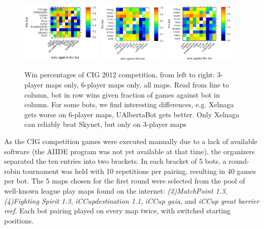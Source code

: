 \documentclass[journal]{IEEEtran}
\begin{document}
\begin{figure}[t]
    \centering
    \includegraphics[width=0.34\textwidth]{figures/vstable3.pdf}
    \includegraphics[width=0.3\textwidth]{figures/vstable6.pdf}
    \includegraphics[width=0.3\textwidth]{figures/vstable.pdf}
    \caption{Win percentages of CIG 2012 competition, from left
    to right: 3-player maps only, 6-player maps only, all maps.
    Read from line to column, bot in row wins given fraction of
    games against bot in column. For some bots, we find interesting
    differences, e.g. Xelnaga gets worse on 6-player maps, UAlbertaBot
    gets better. Only Xelnaga can reliably beat Skynet, but only on 
    3-player maps}
    \label{fig:cig2012-mapresults}
\end{figure}


As the CIG competition games were executed manually due to
a lack of available software (the AIIDE program was not yet
available at that time), the organizers separated the ten entries into
two brackets. In each bracket of 5 bots, a round-robin
tournament was held with 10 repetitions per pairing, resulting
in 40 games per bot.
The 5 maps chosen for the first round were selected from the pool
of well-known league play maps found on the internet:
\emph{(2)MatchPoint 1.3}, \emph{(4)Fighting Spirit 1.3}, 
\emph{iCCupdestination 1.1}, \emph{iCCup gaia}, and 
\emph{iCCup great barrier reef}. Each bot pairing played
on every map twice, with switched starting positions.
\end{document}

